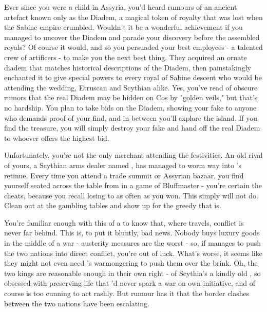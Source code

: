 \documentclass[char]{Kos}
\begin{document}
Ever since you were a child in Assyria, you'd heard rumours of an ancient artefact known only as the Diadem, a magical token of royalty that was lost when the Sabine empire crumbled. Wouldn't it be a wonderful achievement if you managed to uncover the Diadem and parade your discovery before the assembled royals? Of course it would, and so you persuaded your best employees - a talented crew of artificers - to make you the next best thing. They acquired an ornate diadem that matches historical descriptions of the Diadem, then painstakingly enchanted it to give special powers to every royal of Sabine descent who would be attending the wedding, Etruscan and Scythian alike. Yes, you've read of obscure rumors that the real Diadem may be hidden on Cos by "golden veils," but that's no hardship. You plan to take bids on the Diadem, showing your fake to anyone who demands proof of your find, and in between you'll explore the island. If you find the treasure, you will simply destroy your fake and hand off the real Diadem to whoever offers the highest bid.

Unfortunately, you're not the only merchant attending the festivities. An old rival of yours, a Scythian arms dealer named \cArmsDealer{}, has managed to worm \cArmsDealer{\their} way into \cScythiaKing{\Monarch} \cScythiaKing{}'s retinue. Every time you attend a trade summit or Assyrian bazaar, you find yourself seated across the table from \cArmsDealer{\them} in a game of Bluffmaster - you're certain the \cArmsDealer{\human} cheats, because you recall losing to \cArmsDealer{\them} as often as you won. This simply will not do. Clean \cArmsDealer{} out at the gambling tables and show \cArmsDealer{\them} up for the greedy \cArmsDealer{\InsultOne} that \cArmsDealer{\they} is. 

You're familiar enough with this \cArmsDealer{\InsultTwo} of a \cArmsDealer{\human} to know that, where \cArmsDealer{\they} travels, conflict is never far behind. This is, to put it bluntly, bad news. Nobody buys luxury goods in the middle of a war - austerity measures are the worst - so, if \cArmsDealer{} manages to push the two nations into direct conflict, you're out of luck. What's worse, it seems like they might not even need \cArmsDealer{}'s warmongering to push them over the brink. Oh, the two kings are reasonable enough in their own right - \cScythiaKing{} of Scythia's a kindly old \cScythiaKing{\human}, so obsessed with preserving life that \cScythiaKing{\they}'d never spark a war on \cScythiaKing{\their} own initiative, and \cEtruriaKing{} of course is too cunning to act rashly. But rumour has it that the border clashes between the two nations have been escalating. 
\end{document}
